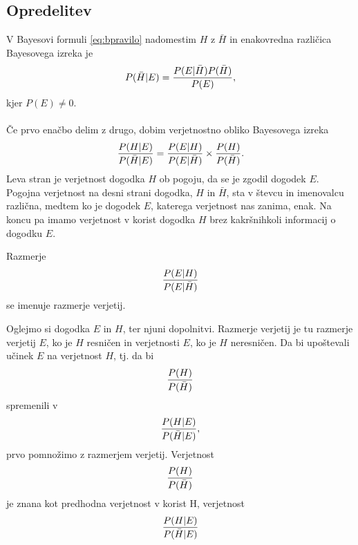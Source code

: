 \documentclass[fin1, tisk]{fmfdelo}
\theoremstyle{definition}
\theoremstyle{trditev}
\theoremstyle{izrek}
\begin{document}
\subsection{Opredelitev}
V Bayesovi formuli \eqref{eq:bpravilo} nadomestim $H$ z $\bar{H}$ in enakovredna različica Bayesovega izreka je
\begin{equation}
   P(\bar{H} \lvert E) = \frac{P(E \lvert \bar{H})P(\bar{H})}{P(E)}, \vspace{2mm}
\end{equation}
kjer $P(E) \ne 0$.\\\\
Če prvo enačbo delim z drugo, dobim verjetnostno obliko Bayesovega izreka
\begin{equation}
   \frac{P(H \lvert E)}{P(\bar{H} \lvert E)} = \frac{P(E \lvert H)}{P(E \lvert \bar{H})} \times \frac{P(H)}{P(\bar{H})}. \vspace{2mm}
\end{equation}
Leva stran je verjetnost dogodka $H$ ob pogoju, da se je zgodil dogodek $E$. Pogojna verjetnost na desni strani dogodka, $H$ in $\bar{H}$,
sta v števcu in imenovalcu različna, medtem ko je dogodek $E$, katerega verjetnost nas zanima, enak. Na koncu pa imamo verjetnost v
korist dogodka $H$ brez kakršnihkoli informacij o dogodku $E$.\\
\begin{definicija}
    Razmerje
    \begin{equation}
        \frac{P(E \lvert H)}{P(E \lvert \bar{H})} \vspace{2mm}
    \end{equation}
     se imenuje razmerje verjetij. \\
\end{definicija}
Oglejmo si dogodka $E$ in $H$, ter njuni dopolnitvi. Razmerje verjetij je tu razmerje verjetij $E$, ko je $H$ resničen in verjetnosti $E$,
ko je $H$ neresničen. Da bi upoštevali učinek $E$ na verjetnost $H$, tj. da bi
\[
   \frac{P(H)}{P(\bar{H})} \vspace{2mm}
\]
spremenili v
\[
   \frac{P(H \lvert E)}{P(\bar{H} \lvert E)}, \vspace{2mm}
\]
prvo pomnožimo z razmerjem verjetij. Verjetnost
\[
   \frac{P(H)}{P(\bar{H})} \vspace{2mm}
\]
je znana kot predhodna verjetnost v korist H, verjetnost
\[
   \frac{P(H \lvert E)}{P(\bar{H} \lvert E)} \vspace{2mm}
\]
\end{document}
